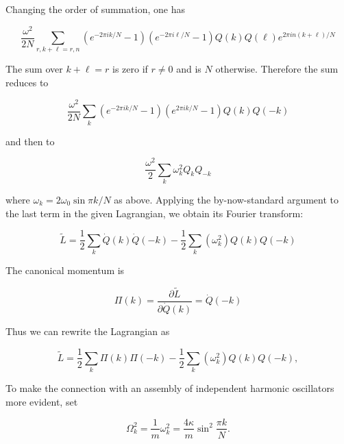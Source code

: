 Changing  the  order  of  summation,  one  has



\begin{equation}
\frac{\omega^2}{2N} \sum_{r, k + \ell = r, n}
(e^{-2\pi i k/N} - 1)
(e^{-2\pi i \ell/N} - 1)
Q(k) Q(\ell)  e^{2\pi i n(k + \ell) /N}
\end{equation}


The  sum  over   $k + \ell = r$  is  zero  if   $r \ne 0$  and  is   $N$  otherwise.   Therefore  the  sum  reduces  to



\begin{equation}
\frac{\omega^2}{2N}\sum_{k}
(e^{-2\pi i k/N} - 1)
(e^{2\pi i k/N} - 1)
Q(k) Q(-k)
\end{equation}


and  then  to



\begin{equation}
\frac{\omega^2}{2} \sum_{k}
\omega_k^2
Q_k Q_{-k}
\end{equation}


where   $\omega_k = 2\omega_0\sin \pi k/N$  as  above.   Applying  the  by-now-standard  argument  to  the  last  term  in  the  given  Lagrangian,  we  obtain  its  Fourier  transform:



\begin{equation}
\tilde L = \frac{1}{2}\sum_k \dot Q(k) \dot Q(-k)
-  \frac{1}{2}\sum_k (\omega_k^2)Q(k)Q(-k)
\end{equation}


The  canonical  momentum  is



\begin{equation}
\Pi(k) = \frac{\partial \tilde L}{\partial \dot Q(k)} = \dot Q(-k)
\end{equation}


Thus  we  can  rewrite  the  Lagrangian  as



\begin{equation}
\tilde L = \frac{1}{2} \sum_k \Pi(k)\Pi(-k)
-  \frac{1}{2}\sum_k (\omega_k^2) Q(k) Q(-k),
\end{equation}


To  make  the  connection  with  an  assembly  of  independent  harmonic  oscillators  more  evident,  set



\begin{equation}
\Omega_k^2 = \frac{1}{m}\omega_k^2 = \frac{4\kappa}{m}\sin^2 \frac{\pi k}{N}.
\end{equation}


